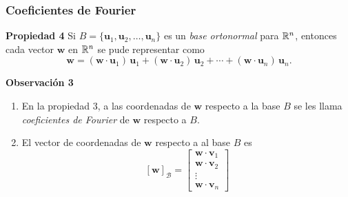 {\nologo
\begin{frame}\frametitle{Coeficientes de Fourier}

\begin{prop}{\textbf{Propiedad 4}}
	\justifying
	Si $B = \{ \mathbf{u}_1, \mathbf{u}_2, \hdots, \mathbf{u}_n\}$ es un \textit{base ortonormal} para $\mathbb{R}^n$, entonces
	cada vector $\mathbf{w}$ en $\mathbb{R}^n$ se pude representar como
	\[
	\mathbf{w} = (\mathbf{w}\cdot \mathbf{u}_1)\, \mathbf{u}_1 + (\mathbf{w}\cdot \mathbf{u}_2)\, \mathbf{u}_2 + \cdots 
	+ (\mathbf{w}\cdot \mathbf{u}_n)\, \mathbf{u}_n.
	\]
	
	\vspace{-1mm}
\end{prop}		

\begin{alertblock}{\textbf{Observación 3}}	
	\begin{enumerate}\justifying
		\item[\labelname{$a$}] En la propiedad 3, a las coordenadas de $\mathbf{w}$ respecto a la base $B$ se les llama \textit{coeficientes de Fourier}
		de $\mathbf{w}$ respecto a $B$.
		\item[\labelname{$b$}] El vector de coordenadas de $\mathbf{w}$ respecto a al base $B$ es
		\[
		\left[ \mathbf{w} \right]_{\mathcal{B}} = 
		\left[
		\begin{array}{c}
		\mathbf{w}\cdot \mathbf{v}_1\\[1mm]
		\mathbf{w}\cdot \mathbf{v}_2\\[1mm]
		\vdots\\[2mm]
		\mathbf{w}\cdot \mathbf{v}_n
		\end{array}
		\right]
		\]
	\end{enumerate}
\end{alertblock}

\end{frame}
}


\subsection{}

